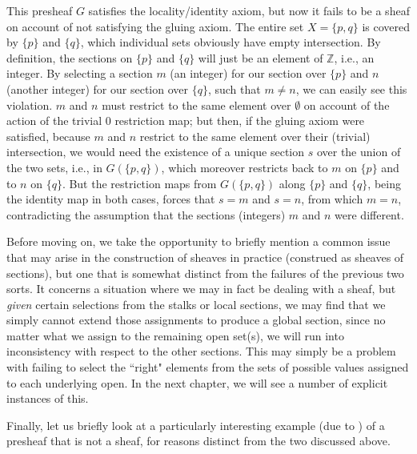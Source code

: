 \documentclass[11pt]{book}
\theoremstyle{definition}
\theoremstyle{definition}
\theoremstyle{definition}
\theoremstyle{theorem}
\theoremstyle{definition}
\begin{document}
This presheaf $G$ satisfies the locality/identity axiom, but now it fails to be a sheaf on account of not satisfying the gluing axiom. The entire set $X = \{p,q\}$ is covered by $\{p\}$ and $\{q\}$, which individual sets obviously have empty intersection. By definition, the sections on $\{p\}$ and $\{q\}$ will just be an element of $\mathbb{Z}$, i.e., an integer. By selecting a section $m$ (an integer) for our section over $\{p\}$ and $n$ (another integer) for our section over $\{q\}$, such that $m \neq n$, we can easily see this violation. $m$ and $n$ must restrict to the same element over $\emptyset$ on account of the action of the trivial $0$ restriction map; but then, if the gluing axiom were satisfied, because $m$ and $n$ restrict to the same element over their (trivial) intersection, we would need the existence of a unique section $s$ over the union of the two sets, i.e., in $G(\{p,q\})$, which moreover restricts back to $m$ on $\{p\}$ and to $n$ on $\{q\}$. But the restriction maps from $G(\{p,q\})$ along $\{p\}$ and $\{q\}$, being the identity map in both cases, forces that $s = m$ and $s = n$, from which $m = n$, contradicting the assumption that the sections (integers) $m$ and $n$ were different. \par      
Before moving on, we take the opportunity to briefly mention a common issue that may arise in the construction of sheaves in practice (construed as sheaves of sections), but one that is somewhat distinct from the failures of the previous two sorts. It concerns a situation where we may in fact be dealing with a sheaf, but \textit{given} certain selections from the stalks or local sections, we may find that we simply cannot extend those assignments to produce a global section, since no matter what we assign to the remaining open set(s), we will run into inconsistency with respect to the other sections. This may simply be a problem with failing to select the ``right" elements from the sets of possible values assigned to each underlying open. In the next chapter, we will see a number of explicit instances of this.\par 
Finally, let us briefly look at a particularly interesting example (due to \cite{goguen_sheaf_1992}) of a presheaf that is not a sheaf, for reasons distinct from the two discussed above.  
\end{document}

